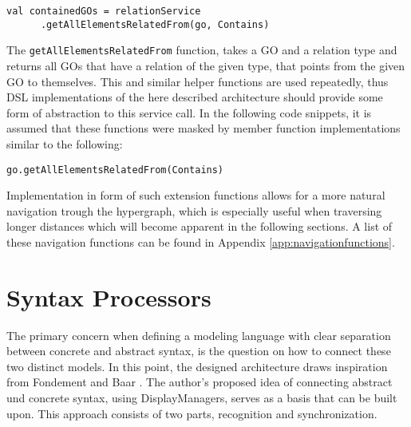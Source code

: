 \begin{lstlisting}[language=customLang, caption={Example on how to get all GOs contained by a given element \texttt{go}, in the CouchEdit architecture}, captionpos=b]
val containedGOs = relationService
      .getAllElementsRelatedFrom(go, Contains) 
\end{lstlisting} 

The \texttt{getAllElementsRelatedFrom} function, takes a GO and a relation type and returns all GOs that have a relation of the given type, that points from the given GO to themselves. This and similar helper functions are used repeatedly, thus DSL implementations of the here described architecture should provide some form of abstraction to this service call. In the following code snippets, it is assumed that these functions were masked by member function implementations similar to the following:
\begin{lstlisting}[caption={The \texttt{getAllElementsRelatedFrom} function, implemented as a member function eases navigation through the hypergraph}, captionpos=b]
go.getAllElementsRelatedFrom(Contains)
\end{lstlisting}
Implementation in form of such extension functions allows for a more natural navigation trough the hypergraph, which is especially useful when traversing longer distances which will become apparent in the following sections. A list of these navigation functions can be found in Appendix \ref{app:navigationfunctions}.


\section{Syntax Processors}
The primary concern when defining a modeling language with clear separation between concrete and abstract syntax, is the question on how to connect these two distinct models. In this point, the designed architecture draws inspiration from Fondement and Baar \cite{fondement_making_2005}. The author's proposed idea of connecting abstract und concrete syntax, using DisplayManagers, serves as a basis that can be built upon. This approach consists of two parts, recognition and synchronization. 

